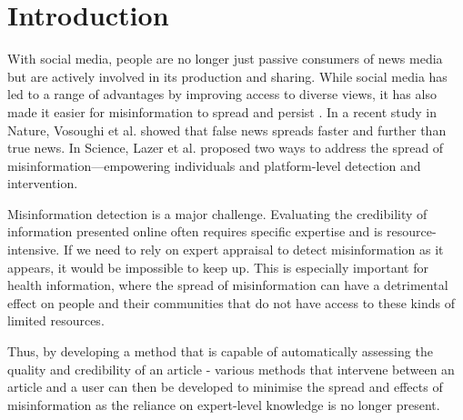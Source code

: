 \documentclass[a4paper,twoside,phd]{BYUPhys}
\begin{document}
 \frontmatter


 \makepreliminarypages


\doublespace
%

%

 \clearemptydoublepage
\singlespace
 \tableofcontents

\clearemptydoublepage
\listoffigures

\clearemptydoublepage
\listoftables

\clearemptydoublepage

\mainmatter
%
\chapter{Introduction}
\label{chap:Introduction}

With social media, people are no longer just passive consumers of news media but are actively involved in its production and sharing. While social media has led to a range of advantages by improving access to diverse views, it has also made it easier for misinformation to spread and persist \cite{qiu2017limited}. In a recent study in Nature, Vosoughi et al. \cite{Vosoughi} showed that false news spreads faster and further than true news. In Science, Lazer et al. \cite{lazer2018science} proposed two ways to address the spread of misinformation---empowering individuals and platform-level detection and intervention. \newline

Misinformation detection is a major challenge. Evaluating the credibility of information presented online often requires specific expertise and is resource-intensive. If we need to rely on expert appraisal to detect misinformation as it appears, it would be impossible to keep up. This is especially important for health information, where the spread of misinformation can have a detrimental effect on people and their communities that do not have access to these kinds of limited resources. \newline

Thus, by developing a method that is capable of automatically assessing the quality and credibility of an article - various methods that intervene between an article and a user can then be developed to minimise the spread and effects of misinformation as the reliance on expert-level knowledge is no longer present.
\end{document}

